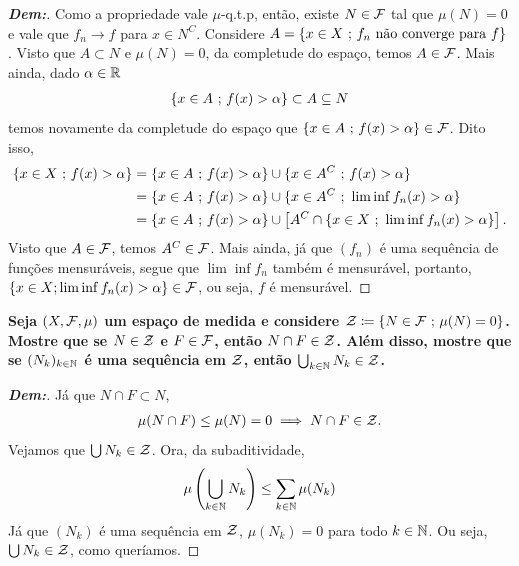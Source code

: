 \begin{proof}[\textbf{Dem:}]Como a propriedade vale $\mu$-q.t.p, então, existe $N \in \mathcal F$ tal que $\mu(N) = 0$ e 
  vale que $f_n \rightarrow f$ para $x \in N^C$. Considere $A = \{x \in X\text{ ; } f_n\text{ não converge para }f\}$. Visto que 
  $A \subset N$ e $\mu(N) = 0$, da completude do espaço, temos $A \in \mathcal F$. Mais ainda, dado $\alpha \in \mathbb R$
  \begin{align*}
    \{x \in A \text{ ; } f(x) > \alpha\} \subset A \subseteq N
  \end{align*}
  temos novamente da completude do espaço que $\{x \in A \text{ ; } f(x)>\alpha\} \in \mathcal F$. Dito isso, 
  \begin{align*}
    \{x \in X \text{ ; } f(x)> \alpha \} &=
    \{x \in A \text{ ; } f(x)>\alpha\}\cup \{x \in A^C \text{ ; } f(x) > \alpha\}\\
    &= \{x \in A \text{ ; } f(x)>\alpha\}\cup \{x \in A^C \text{ ; } \lim \inf f_n(x) > \alpha\}\\
    &= \{x \in A \text{ ; } f(x)>\alpha\}\cup \left[A^C \cap \{x \in X \text{ ; } 
    \lim \inf f_n(x) > \alpha\}\right]. 
  \end{align*}
  Visto que $A \in \mathcal F$, temos $A^C \in \mathcal F$. Mais ainda, já que $(f_n)$ é 
  uma sequência de funções mensuráveis, segue que $\lim \inf f_n$ também é mensurável,
  portanto,
  $\{x \in X; \lim \inf f_n(x)> \alpha\} \in \mathcal F$, 
  ou seja, $f$ é mensurável.
\end{proof}
\biglinend
\newpage
{}
\myexe{\thedois}
\bigline 
\textbf{Seja $(X, \mathcal F, \mu)$ um espaço de medida e considere $\mathcal Z\coloneq \{N \in \mathcal F\text{ ; } \mu(N) = 0\}$. 
Mostre que se $N \in \mathcal Z$ e $F \in \mathcal F$, então $N \cap F \in \mathcal Z$. Além disso, mostre que se 
$(N_k)_{k \in \mathbb N}$ é uma sequência em $\mathcal Z$, então $\bigcup_{k \in \mathbb N} N_k \in \mathcal Z$.}
\begin{proof}[\textbf{Dem:}]
 Já que $N \cap F \subset N$, 
  \begin{align*}
    \mu(N \cap F) \le \mu(N) = 0 \implies N\cap F \in \mathcal Z. 
  \end{align*}
  Vejamos que $\bigcup N_k \in \mathcal Z$. Ora, da subaditividade, 
  \begin{align*}
    \mu\left(\bigcup\limits_{k \in \mathbb N} N_k\right) \le \sum_{k \in \mathbb N} \mu(N_k)
  \end{align*}
  Já que $(N_k)$ é uma sequência em $\mathcal Z$, $\mu(N_k) = 0$ para todo $k \in \mathbb N$. Ou seja, 
  $\bigcup N_k \in \mathcal Z$, como queríamos.
\end{proof}
